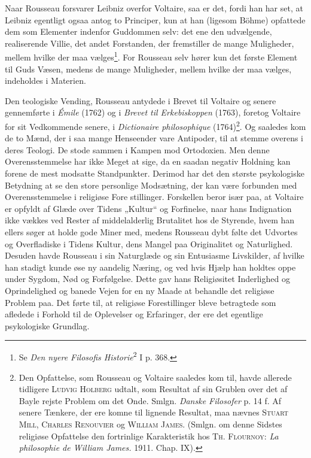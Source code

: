 \documentclass[12pt,a4paper,openany]{book}
\newcommand{\opage}[1]{\marginnote{\footnotesize\textit{[#1]}}}
\begin{document}
Naar Rousseau forsvarer Leibniz overfor Voltaire, saa er
det, fordi han har set, at Leibniz egentligt ogsaa antog to Principer,
kun at han (ligesom Böhme) opfattede dem som Elementer
indenfor Guddommen selv: det ene den udvælgende, realiserende
Villie, det andet Forstanden, der fremstiller de mange Muligheder,
mellem hvilke der maa vælges\footnote[1]{Se \textit{Den nyere Filosofis Historie}\textsuperscript{2} I p. 368.}. For Rousseau selv
hører kun det første Element til Guds Væsen, medens de
mange Muligheder, mellem hvilke der maa vælges, indeholdes
i Materien.

Den teologiske Vending, Rousseau antydede i Brevet til
Voltaire og senere gennemførte i \textit{Émile} (1762) og i \textit{Brevet til
Erkebiskoppen} (1763), foretog Voltaire for sit Vedkommende
senere, i \textit{Dictionaire philosophique} (1764)\footnote[2]{Den Opfattelse, som Rousseau og Voltaire saaledes kom til, havde allerede tidligere \textsc{Ludvig Holberg} udtalt, som Resultat af sin Grublen over det af Bayle rejste Problem om det Onde. Smlgn. \textit{Danske Filosofer} p. 14 f. Af senere Tænkere, der ere komne til lignende Resultat, maa nævnes \textsc{Stuart Mill}, \textsc{Charles Renouvier} og \textsc{William James}. (Smlgn. om denne Sidstes religiøse Opfattelse den fortrinlige Karakteristik hos \textsc{Th. Flournoy}: \textit{La philosophie de William James.} 1911. Chap. IX).}. Og saaledes kom
de to Mænd, der i saa mange Henseender vare Antipoder, til
at stemme overens i deres Teologi. De stode sammen i Kampen
mod Ortodoxien. Men denne Overensstemmelse har ikke
Meget at sige, da en saadan negativ Holdning kan forene de
mest modsatte Standpunkter. Derimod har det den største psykologiske
Betydning at se den store personlige Modsætning, der
kan være forbunden med Overensstemmelse i religiøse Fore%
\setcounter{footnote}{0}%
\opage{155}stillinger. Forskellen beror især paa, at Voltaire er opfyldt af
Glæde over Tidens „Kultur“ og Forfinelse, naar hans Indignation
ikke vækkes ved Rester af middelalderlig Brutalitet hos de
Styrende, hvem han ellers søger at holde gode Miner med,
medens Rousseau dybt følte det Udvortes og Overfladiske i
Tidens Kultur, dens Mangel paa Originalitet og Naturlighed.
Desuden havde Rousseau i sin Naturglæde og sin Entusiasme
Livskilder, af hvilke han stadigt kunde øse ny aandelig Næring,
og ved hvis Hjælp han holdtes oppe under Sygdom, Nød og
Forfølgelse. Dette gav hans Religiøsitet Inderlighed og Oprindelighed
og banede Vejen for en ny Maade at behandle det religiøse
Problem paa. Det førte til, at religiøse Forestillinger
bleve betragtede som afledede i Forhold til de Oplevelser og
Erfaringer, der ere det egentlige psykologiske Grundlag.
\end{document}
